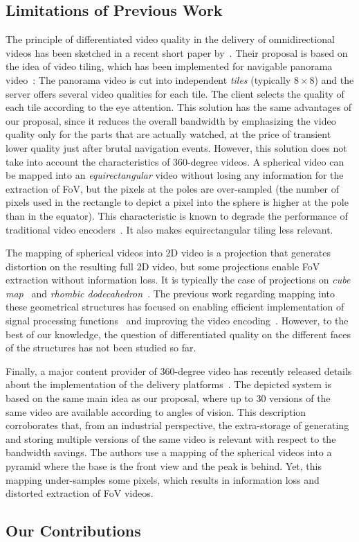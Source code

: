 \subsection{Limitations of Previous Work}

The principle of differentiated video quality in the delivery of omnidirectional videos has been sketched 
in a recent short paper by~\citet{ochi_live_2015}. Their proposal is based on the idea of video
tiling, which has been implemented for navigable panorama 
video~\cite{sanchez_compressed_2015,wang_mixing_2014,gaddam_tiling_2015}: The panorama video 
is cut into independent \emph{tiles} (typically $8\times 8$) and the server offers several
video qualities for each tile. The client selects the quality of each tile according to the eye attention. This
solution has the same advantages of our proposal, since it reduces the overall bandwidth by emphasizing
the video quality only for the parts that are actually watched, at the price of transient lower quality just after
brutal navigation events. However, this solution does not take into account the characteristics of 360-degree
videos. A spherical video can be mapped into an \emph{equirectangular} video without losing any information
for the extraction of \ac{FoV}, but the pixels at the poles are over-sampled (the number of pixels
used in the rectangle to depict a pixel into the sphere is higher at the pole than in the equator). 
This characteristic is known to degrade the
performance of traditional video encoders~\cite{wojciechowski_h.264_2006,yu_framework_2015}. It also 
makes equirectangular tiling less relevant.

The mapping of spherical videos into 2D video is a projection that generates distortion on the resulting
full 2D video, but some projections enable \ac{FoV} extraction without information loss. It is typically the case of 
projections on \emph{cube map}~\cite{Ng2005} and 
\emph{rhombic dodecahedron}~\cite{fu_rhombic_2009}. The previous work regarding mapping into these
geometrical structures has focused on enabling efficient implementation of signal processing 
functions~\cite{kazhdan_metric-aware_2010} and improving the video encoding~\cite{tosic_low_2009}. 
However, to the best of our knowledge, the 
question of differentiated quality on the different faces of the structures has not been studied so far.

Finally, a major content provider of 360-degree video has recently released details about the 
implementation of the delivery platforms~\cite{facebook}. The depicted system is based on the same
main idea as our proposal, where up to 30 versions of the same video are available according to angles
of vision. This description corroborates that, from an industrial perspective, the extra-storage of
generating and storing multiple versions of the same video is relevant with respect to the bandwidth
savings. The authors use a mapping of the spherical videos into a pyramid where the base is the front
view and the peak is behind. Yet, this mapping under-samples some pixels, which results in 
information loss and distorted extraction of \ac{FoV} videos.

\subsection{Our Contributions}


